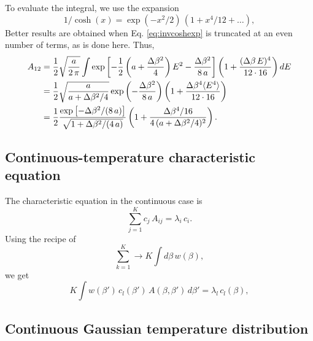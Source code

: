 \documentclass[aip,jcp,preprint,notitlepage, superscriptaddress]{revtex4-1}
\begin{document}
To evaluate the integral,
we use the expansion
\begin{equation}
1/\cosh(x)
=
\exp(-x^2/2) \,
(1 + x^4/12 + \dots),
\label{eq:invcoshexp}
\end{equation}
%
Better results are obtained
when Eq. \eqref{eq:invcoshexp}
is truncated at an even number of terms,
as is done here.
%
Thus,
\begin{align}
A_{12}
&=
\frac 1 2
\sqrt{ \frac a { 2 \, \pi } }
\int
  \exp\left[
    -\frac 1 2
      \left(
          a + \frac{\Delta \beta^2}{4}
      \right) E^2
    - \frac{
      \Delta \beta^2
    }{ 8 \, a }
  \right]
  \left(
    1 + \frac{ (\Delta \beta \, E)^4 } { 12 \cdot 16 }
  \right)
dE
\notag \\
&=
\frac 1 2
\sqrt{
  \frac{ a  }
  { a +  \Delta \beta^2/4 }
}
\exp\left(
  - \frac{
    \Delta \beta^2
  }{ 8 \, a }
\right)
\left(
  1 + \frac{ \Delta \beta^4 \langle E^4 \rangle}
  { 12 \cdot 16 }
\right)
\notag \\
&=
\frac 1 2
\frac
{
  \exp\left[
    - \Delta \beta^2 / (8 \, a)
  \right]
}
{
  \sqrt{1 +  \Delta \beta^2/(4 \, a) }
}
\left(
  1 + \frac{ \Delta \beta^4 / 16 }
  { 4 \, (a + \Delta \beta^2 / 4)^2}
\right).
\end{align}




\subsection{Continuous-temperature characteristic equation}



The characteristic equation
in the continuous case is
%
\begin{equation}
\sum_{j = 1}^K
  c_j \, A_{ij}
= \lambda_i \, c_i.
\end{equation}
%
Using the recipe of
\[
\sum_{k = 1}^K
\rightarrow
K \int d\beta \, w(\beta),
\]
we get
\begin{equation}
K \int w(\beta') \, c_l(\beta') \, A(\beta, \beta') \, d\beta'
= \lambda_l \, c_l(\beta),
\tag{B9}
\label{eq:eig_continuous}
\end{equation}



\subsection{Continuous Gaussian temperature distribution}
\end{document}
